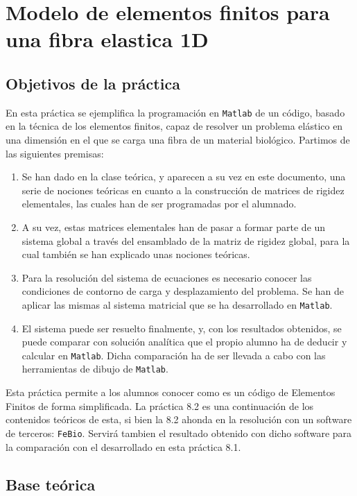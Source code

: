 \chapter{Modelo de elementos finitos para una fibra elastica 1D}
\label{cap1}


\section{Objetivos de la práctica}
\label{sec:objetivos}

En esta práctica se ejemplifica la programación en \texttt{Matlab} de un código, basado en la técnica de los elementos finitos, capaz de resolver un problema elástico en una dimensión en el que se carga una fibra de un material biológico. Partimos de las siguientes premisas:
\begin{enumerate}
	\item
	Se han dado en la clase teórica, y aparecen a su vez en este documento, una serie de nociones teóricas en cuanto a la construcción de matrices de rigidez elementales, las cuales han de ser programadas por el alumnado.
	\item
	A su vez, estas matrices elementales han de pasar a formar parte de un sistema global a través del ensamblado de la matriz de rigidez global, para la cual también se han explicado unas nociones teóricas.
	\item
	Para la resolución del sistema de ecuaciones es necesario conocer las condiciones de contorno de carga y desplazamiento del problema. Se han de aplicar las mismas al sistema matricial que se ha desarrollado en \texttt{Matlab}.
	\item
	El sistema puede ser resuelto finalmente, y, con los resultados obtenidos, se puede comparar con solución analítica que el propio alumno ha de deducir y calcular en \texttt{Matlab}. Dicha comparación ha de ser llevada a cabo con las herramientas de dibujo de \texttt{Matlab}.
\end{enumerate}
Esta pr\'actica permite a los alumnos conocer como es un código de Elementos Finitos de forma simplificada. La pr\'actica 8.2 es una continuación de los contenidos te\'oricos de esta, si bien la 8.2 ahonda en la resoluci\'on con un software de terceros: \texttt{FeBio}. Servirá tambien el resultado obtenido con dicho software para la comparaci\'on con el desarrollado en esta pr\'actica 8.1.

\section{Base teórica}
\label{sec:teoria}


